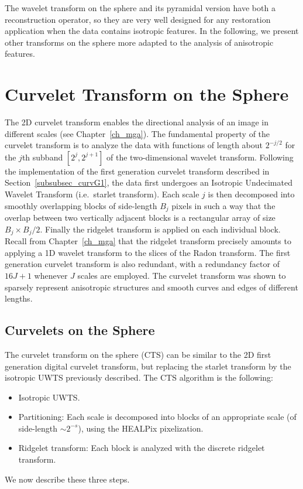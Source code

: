 The wavelet transform on the sphere and its pyramidal version have both a reconstruction operator, so they are very well designed for any restoration application when the data contains isotropic features. In the following, we present other transforms on the sphere more adapted to the analysis of anisotropic features.
 


\section{Curvelet Transform on the Sphere }
\label{sect_cur}

The 2D curvelet transform enables the directional analysis of an image in different scales (see Chapter~\ref{ch_mga}). 
The fundamental property of the curvelet transform is to 
analyze the data with functions of length about
 $2^{-j/2}$ for the $j$th subband $[2^j, 2^{j+1}]$ of the 
two-dimensional wavelet transform.   
Following the implementation of the first generation curvelet transform described in Section~\ref{subsubsec_curvG1}, the data first undergoes 
an Isotropic Undecimated Wavelet Transform (i.e.\ starlet transform). Each scale $j$ is then decomposed into smoothly overlapping blocks of
side-length $B_j$ pixels in such a way that the overlap between two
vertically adjacent blocks is a rectangular array of size $B_j \times B_j/2$.
Finally the ridgelet transform is applied on each individual block. Recall from Chapter~\ref{ch_mga} that the ridgelet transform
precisely amounts to applying a 1D wavelet transform to the
slices of the Radon transform. The first generation curvelet transform is also redundant, with a redundancy factor of $16J+1$ whenever $J$ scales
are employed. The curvelet transform was shown to sparsely represent anisotropic structures and smooth curves and edges of different lengths.

\subsection{Curvelets on the Sphere}
The curvelet transform on the sphere (CTS) can be similar to the 2D first generation digital curvelet transform,
but replacing the starlet transform by the isotropic UWTS previously 
described. The CTS algorithm is the following:
\begin{itemize}
\item Isotropic UWTS. 
\item Partitioning: Each scale is decomposed into blocks of an appropriate scale (of side-length $\sim2^{-s}$), using the HEALPix pixelization.
\item Ridgelet transform: Each block is analyzed with the discrete ridgelet transform.
\end{itemize}
We now describe these three steps.


